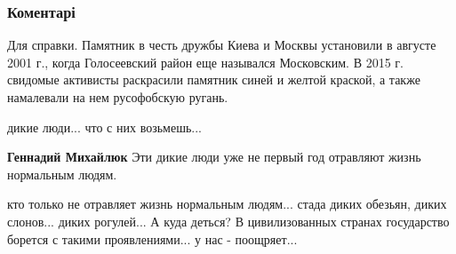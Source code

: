  
 
 
 
 
\subsubsection{Коментарі}
\label{sec:06_09_2021.fb.kolesnikov_anton.1.kiev_pamjatnik_druzhba_moskva.cmt}

\begin{itemize}
 
Для справки. Памятник в честь дружбы Киева и Москвы установили в августе 2001 г., когда Голосеевский район еще назывался Московским. В 2015 г. свидомые активисты раскрасили памятник синей и желтой краской, а также намалевали на нем русофобскую ругань.

 
дикие люди... что с них возьмешь...

\begin{itemize}
 
\textbf{Геннадий Михайлюк} Эти дикие люди уже не первый год отравляют жизнь нормальным людям.

 

кто только не отравляет жизнь нормальным людям... стада диких обезьян, диких
слонов... диких рогулей... А куда деться? В цивилизованных странах государство
борется с такими проявлениями... у нас - поощряет...



\end{itemize}
\end{itemize}
